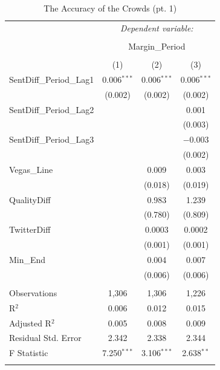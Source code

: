 \documentclass[12pt]{article}
\begin{document}
\begin{doublespacing}
\begin{table}[H] 
\centering 
\caption{The Accuracy of the Crowds (pt. 1)} 
\label{} 
\begin{tabular*}{\textwidth}{@{\extracolsep{\fill}}lccc} 
\hline 
\hline
 & \multicolumn{3}{c}{\textit{Dependent variable:}} \\ 
\cline{2-4} 
\\[-3.0ex] & \multicolumn{3}{c}{Margin\_Period} \\ 
\\[-1.5ex] & (1) & (2) & (3)\\ 
\hline
 SentDiff\_Period\_Lag1 & 0.006$^{***}$ & 0.006$^{***}$ & 0.006$^{***}$ \\ 
  & (0.002) & (0.002) & (0.002) \\ 
 SentDiff\_Period\_Lag2 &  &  & 0.001 \\ 
  &  &  & (0.003) \\ 
 SentDiff\_Period\_Lag3 &  &  & $-$0.003 \\ 
  &  &  & (0.002) \\ 
 Vegas\_Line &  & 0.009 & 0.003 \\ 
  &  & (0.018) & (0.019) \\ 
 QualityDiff &  & 0.983 & 1.239 \\ 
  &  & (0.780) & (0.809) \\ 
 TwitterDiff &  & 0.0003 & 0.0002 \\ 
  &  & (0.001) & (0.001) \\ 
 Min\_End &  & 0.004 & 0.007 \\ 
  &  & (0.006) & (0.006) \\ 
\hline \\[-1.8ex] 
Observations & 1,306 & 1,306 & 1,226 \\ 
R$^{2}$ & 0.006 & 0.012 & 0.015 \\ 
Adjusted R$^{2}$ & 0.005 & 0.008 & 0.009 \\ 
Residual Std. Error & 2.342 & 2.338 & 2.344 \\ 
F Statistic & 7.250$^{***}$ & 3.106$^{***}$ & 2.638$^{**}$ \\ 
\hline 
\hline \\[-1.8ex] 
\end{tabular*} 
\end{table} 


\end{doublespacing}
\end{document}
